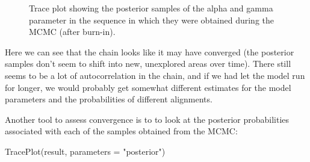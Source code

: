 \documentclass[
  letterpaper,
  DIV=11,
  numbers=noendperiod]{scrartcl}
\newenvironment{Shaded}{\begin{snugshade}}{\end{snugshade}}
\newcommand{\AttributeTok}[1]{\textcolor[rgb]{0.40,0.45,0.13}{#1}}
\newcommand{\FunctionTok}[1]{\textcolor[rgb]{0.28,0.35,0.67}{#1}}
\newcommand{\NormalTok}[1]{\textcolor[rgb]{0.00,0.23,0.31}{#1}}
\newcommand{\StringTok}[1]{\textcolor[rgb]{0.13,0.47,0.30}{#1}}
\begin{document}
\begin{figure}[H]


\caption{\label{fig-10}Trace plot showing the posterior samples of the
alpha and gamma parameter in the sequence in which they were obtained
during the MCMC (after burn-in).}

\end{figure}%

Here we can see that the chain looks like it may have converged (the
posterior samples don't seem to shift into new, unexplored areas over
time). There still seems to be a lot of autocorrelation in the chain,
and if we had let the model run for longer, we would probably get
somewhat different estimates for the model parameters and the
probabilities of different alignments.

Another tool to assess convergence is to to look at the posterior
probabilities associated with each of the samples obtained from the
MCMC:

\begin{Shaded}
\begin{Highlighting}[]
\FunctionTok{TracePlot}\NormalTok{(result, }\AttributeTok{parameters =} \StringTok{"posterior"}\NormalTok{)}
\end{Highlighting}
\end{Shaded}
\end{document}
